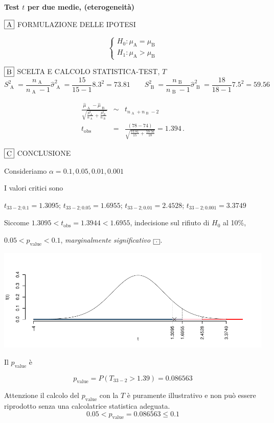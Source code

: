 \documentclass[
  11pt,
]{book}
\theoremstyle{mytheoremstyle}
\theoremstyle{mydefstyle}
\newenvironment{sol}
  {
  \begin{tcolorbox}[enhanced,breakable,arc=0.1mm,boxrule=1pt,colback=white,colframe=iblue,
  title=\bf \fontfamily{lmss}\selectfont \hspace{.5 cm} Soluzione,drop fuzzy shadow]

}{
\end{tcolorbox}
  }
\begin{document}
\begin{sol}
\textbf{Test \(t\) per due medie, (eterogeneità)}

\(\fbox{A}\) FORMULAZIONE DELLE IPOTESI

\[\begin{cases}
   H_0: \mu_\text{A} = \mu_\text{B} \\
   H_1: \mu_\text{A} > \mu_\text{B} 
   \end{cases}\]

\(\fbox{B}\) SCELTA E CALCOLO STATISTICA-TEST, \(T\)
\[
     S^2_\text{ A }=\frac{n_\text{ A }}{n_\text{ A }-1}\hat\sigma^2_\text{ A }=\frac{ 15 }{ 15 -1} 8.3 ^2= 73.81  \qquad
     S^2_\text{ B }=\frac{n_\text{ B }}{n_\text{ B }-1}\hat\sigma^2_\text{ B }=\frac{ 18 }{ 18 -1} 7.5 ^2= 59.56 
   \]

\begin{eqnarray*}
   \frac{\hat\mu_\text{ A } - \hat\mu_\text{ B }}
   {\sqrt{\frac {S^2_\text{ A }}{n_\text{ A }}+\frac {S^2_\text{ B }}{n_\text{ B }}}}&\sim&t_{n_\text{ A }+n_\text{ B }-2}\\
   t_{\text{obs}}
   &=& \frac{ ( 78 -  74 )} {\sqrt{\frac{ 73.81 }{ 15 }+\frac{ 59.56 }{ 18 }}}
   =   1.394 \, .
   \end{eqnarray*}

\(\fbox{C}\) CONCLUSIONE

Consideriamo \(\alpha=0.1, 0.05, 0.01, 0.001\)

I valori critici sono

\(t_{33-2;0.1}=1.3095\); \(t_{33-2;0.05}=1.6955\); \(t_{33-2;0.01}=2.4528\); \(t_{33-2;0.001}=3.3749\)

Siccome \(1.3095<t_\text{obs}=1.3944<1.6955\), indecisione sul rifiuto di \(H_0\) al 10\%,

\(0.05<p_\text{value}<0.1\), \emph{marginalmente significativo} \(\fbox{.}\).

\begin{center}\includegraphics{Esami_passati_con_soluzioni_files/figure-latex/05-test-14,-1} \end{center}

Il \(p_{\text{value}}\) è

\[ p_{\text{value}} = P(T_{33-2}>1.39)=0.086563 \]

Attenzione il calcolo del \(p_\text{value}\) con la \(T\) è puramente illustrativo e non può essere riprodotto senza una calcolatrice statistica adeguata.\[
 0.05 < p_\text{value}= 0.086563 \leq 0.1 
\]

\end{sol}
\end{document}
